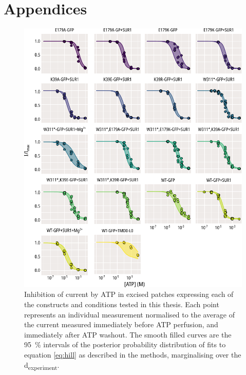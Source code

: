 \chapter{\label{ch:8-appendix}Appendices} 

\graphicspath{{figures/appendix/}}

\begin{figure}[h]
	\centering
	\includegraphics[width=\textwidth]{all_atp_fits.pdf}
	\caption[ATP inhibition population hill fits]{
	Inhibition of current by ATP in excised patches expressing each of the constructs and conditions tested in this thesis.
	Each point represents an individual measurement normalised to the average of the current measured immediately before ATP perfusion, and immediately after ATP washout.
	The smooth filled curves are the \SI{95}{\percent} intervals of the posterior probability distribution of fits to equation \ref{eq:hill} as described in the methods, marginalising over the \textgreek{d}\textsubscript{experiment}.
	}
	\label{apxfig:atp_inhib_1}
\end{figure}

